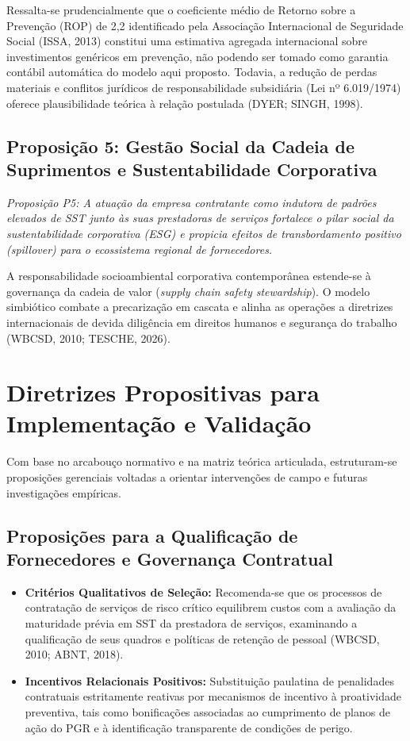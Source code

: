 \documentclass[12pt,a4paper]{article}
\begin{document}
Ressalta-se prudencialmente que o coeficiente médio de Retorno sobre a Prevenção (ROP) de 2,2 identificado pela Associação Internacional de Seguridade Social (ISSA, 2013) constitui uma estimativa agregada internacional sobre investimentos genéricos em prevenção, não podendo ser tomado como garantia contábil automática do modelo aqui proposto. Todavia, a redução de perdas materiais e conflitos jurídicos de responsabilidade subsidiária (Lei nº 6.019/1974) oferece plausibilidade teórica à relação postulada (DYER; SINGH, 1998).

\subsection{Proposição 5: Gestão Social da Cadeia de Suprimentos e Sustentabilidade Corporativa}
\textit{Proposição P5: A atuação da empresa contratante como indutora de padrões elevados de SST junto às suas prestadoras de serviços fortalece o pilar social da sustentabilidade corporativa (ESG) e propicia efeitos de transbordamento positivo (\textit{spillover}) para o ecossistema regional de fornecedores.}

A responsabilidade socioambiental corporativa contemporânea estende-se à governança da cadeia de valor (\textit{supply chain safety stewardship}). O modelo simbiótico combate a precarização em cascata e alinha as operações a diretrizes internacionais de devida diligência em direitos humanos e segurança do trabalho (WBCSD, 2010; TESCHE, 2026).

\section{Diretrizes Propositivas para Implementação e Validação}

Com base no arcabouço normativo e na matriz teórica articulada, estruturam-se proposições gerenciais voltadas a orientar intervenções de campo e futuras investigações empíricas.

\subsection{Proposições para a Qualificação de Fornecedores e Governança Contratual}
\begin{itemize}[leftmargin=1.5cm]
  \item \textbf{Critérios Qualitativos de Seleção:} Recomenda-se que os processos de contratação de serviços de risco crítico equilibrem custos com a avaliação da maturidade prévia em SST da prestadora de serviços, examinando a qualificação de seus quadros e políticas de retenção de pessoal (WBCSD, 2010; ABNT, 2018).
  \item \textbf{Incentivos Relacionais Positivos:} Substituição paulatina de penalidades contratuais estritamente reativas por mecanismos de incentivo à proatividade preventiva, tais como bonificações associadas ao cumprimento de planos de ação do PGR e à identificação transparente de condições de perigo.
\end{itemize}
\end{document}
